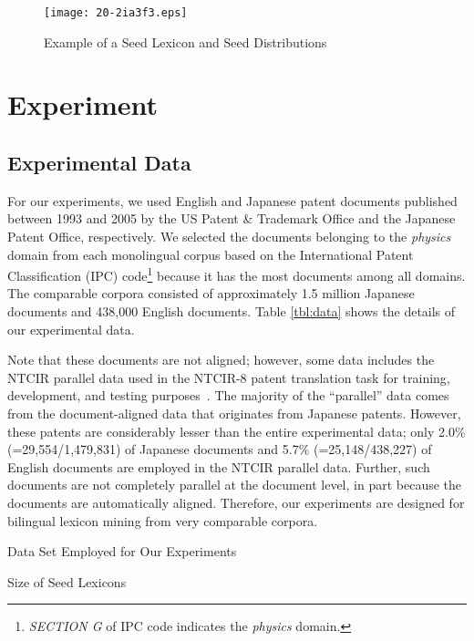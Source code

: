 \documentclass[english]{jnlp_1.4}
\begin{document}
\begin{figure}[t]
\begin{center}
\texttt{[image: 20-2ia3f3.eps]}
\end{center}
\caption{Example of a Seed Lexicon and Seed Distributions}
\label{fig:example2}
\end{figure}


\section{Experiment}
\label{sect:experiment}


\subsection{Experimental Data}

For our experiments, we used English and Japanese patent documents published between 1993 and 2005 by the US Patent \& Trademark Office and the Japanese Patent Office, respectively. 
We selected the documents belonging to the \textit{physics} domain from each monolingual corpus based on the International Patent Classification (IPC) code\footnote{\textit{SECTION G} of IPC code indicates the \textit{physics} domain.} because it has the most documents among all domains. The comparable corpora consisted of approximately 1.5 million Japanese documents and 438,000 English documents. 
Table \ref{tbl:data} shows the details of our experimental data. 

Note that these documents are not aligned; however, some data includes the NTCIR parallel data used in the NTCIR-8 patent translation task for training, development, and testing purposes~\cite{fujita10}. 
The majority of the ``parallel'' data comes from the document-aligned data that originates from Japanese patents. 
However, these patents are considerably lesser than the entire experimental data; 
only 2.0\% (=29,554/1,479,831) of Japanese documents and 5.7\% (=25,148/438,227) of English documents are employed in the NTCIR parallel data. 
Further, such documents are not completely parallel at the document level, in part because the documents are automatically aligned. 
Therefore, our experiments are designed for bilingual lexicon mining from very comparable corpora. 

\begin{table}[b]
\caption{Data Set Employed for Our Experiments}
\label{tbl:data}

\end{table}
\begin{table}[b]
\caption{Size of Seed Lexicons}
\label{tbl:seed}

\end{table}
\end{document}
